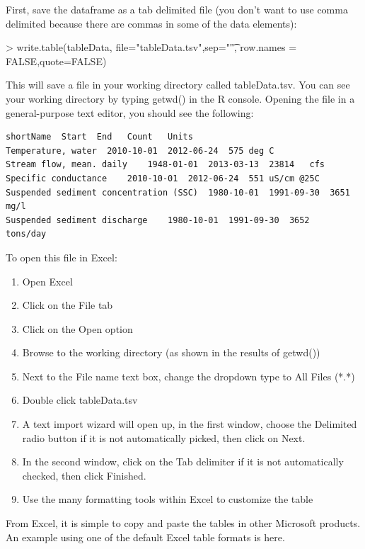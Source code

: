 \documentclass[a4paper,11pt]{article}
\begin{document}
First, save the dataframe as a tab delimited file (you don't want to use comma delimited because there are commas in some of the data elements):


\begin{Schunk}
\begin{Sinput}
> write.table(tableData, file="tableData.tsv",sep="\t",
             row.names = FALSE,quote=FALSE)
\end{Sinput}
\end{Schunk}

This will save a file in your working directory called tableData.tsv.  You can see your working directory by typing getwd() in the R console. Opening the file in a general-purpose text editor, you should see the following:

\begin{verbatim}
shortName  Start  End	Count	Units
Temperature, water	2010-10-01	2012-06-24	575	deg C
Stream flow, mean. daily	1948-01-01	2013-03-13	23814	cfs
Specific conductance	2010-10-01	2012-06-24	551	uS/cm @25C
Suspended sediment concentration (SSC)	1980-10-01	1991-09-30	3651	mg/l
Suspended sediment discharge	1980-10-01	1991-09-30	3652	tons/day
\end{verbatim}

To open this file in Excel:
\begin{enumerate}
\item Open Excel
\item Click on the File tab
\item Click on the Open option
\item Browse to the working directory (as shown in the results of getwd())
\item Next to the File name text box, change the dropdown type to All Files (*.*)
\item Double click tableData.tsv
\item A text import wizard will open up, in the first window, choose the Delimited radio button if it is not automatically picked, then click on Next.
\item In the second window, click on the Tab delimiter if it is not automatically checked, then click Finished.
\item Use the many formatting tools within Excel to customize the table
\end{enumerate}

From Excel, it is simple to copy and paste the tables in other Microsoft products. An example using one of the default Excel table formats is here.
\end{document}
